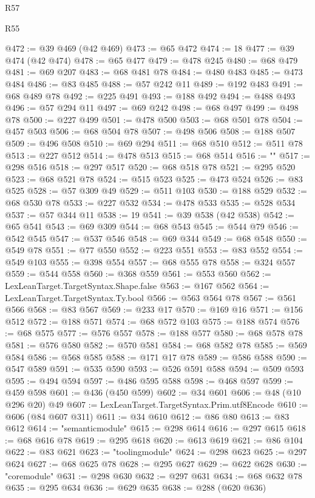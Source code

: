 \begin{lexlean}{R57}
\begin{lexlean}{R55}
\begin{coremodule}
{{{{{{{{{{{{{{{{{{{{{{{{{{{{{{{{{{{{{{{{{{{{{{{{{{{{{{{{{{{{{@472 := @39 @469 (@42 @469)
@473 := @65 @472
@474 := 18
@477 := @39 @474 (@42 @474)
@478 := @65 @477
@479 := @478 @245
@480 := @68 @479
@481 := @69 @207
@483 := @68 @481 @78
@484 := @480 @483
@485 := @473 @484
@486 := @83 @485
@488 := @57 @242 @11
@489 := @192 @483
@491 := @68 @489 @78
@492 := @225 @491
@493 := @188 @492
@494 := @488 @493
@496 := @57 @294 @11
@497 := @69 @242
@498 := @68 @497
@499 := @498 @78
@500 := @227 @499
@501 := @478 @500
@503 := @68 @501 @78
@504 := @457 @503
@506 := @68 @504 @78
@507 := @498 @506
@508 := @188 @507
@509 := @496 @508
@510 := @69 @294
@511 := @68 @510
@512 := @511 @78
@513 := @227 @512
@514 := @478 @513
@515 := @68 @514
@516 := "{"
@517 := @298 @516
@518 := @297 @517
@520 := @68 @518 @78
@521 := @295 @520
@523 := @68 @521 @78
@524 := @515 @523
@525 := @473 @524
@526 := @83 @525
@528 := @57 @309 @49
@529 := @511 @103
@530 := @188 @529
@532 := @68 @530 @78
@533 := @227 @532
@534 := @478 @533
@535 := @528 @534
@537 := @57 @344 @11
@538 := 19
@541 := @39 @538 (@42 @538)
@542 := @65 @541
@543 := @69 @309
@544 := @68 @543
@545 := @544 @79
@546 := @542 @545
@547 := @537 @546
@548 := @69 @344
@549 := @68 @548
@550 := @549 @78
@551 := @77 @550
@552 := @223 @551
@553 := @83 @552
@554 := @549 @103
@555 := @398 @554
@557 := @68 @555 @78
@558 := @324 @557
@559 := @544 @558
@560 := @368 @559
@561 := @553 @560
@562 := LexLeanTarget.TargetSyntax.Shape.false
@563 := @167 @562
@564 := LexLeanTarget.TargetSyntax.Ty.bool
@566 := @563 @564 @78
@567 := @561 @566
@568 := @83 @567
@569 := @233 @17
@570 := @169 @16
@571 := @156 @512
@572 := @188 @571
@574 := @68 @572 @103
@575 := @188 @574
@576 := @68 @575
@577 := @576 @557
@578 := @188 @577
@580 := @68 @578 @78
@581 := @576 @580
@582 := @570 @581
@584 := @68 @582 @78
@585 := @569 @584
@586 := @568 @585
@588 := @171 @17 @78
@589 := @586 @588
@590 := @547 @589
@591 := @535 @590
@593 := @526 @591 @588
@594 := @509 @593
@595 := @494 @594
@597 := @486 @595 @588
@598 := @468 @597
@599 := @459 @598
@601 := @436 (@450 @599)
@602 := @34 @601
@606 := @48 (@10 @296 @20) @49
@607 := LexLeanTarget.TargetSyntax.Prim.utf8Encode
@610 := @606 (@84 @607 @311)
@611 := @34 @610
@612 := @86 @80
@613 := @83 @612
@614 := "semanticmodule"
@615 := @298 @614
@616 := @297 @615
@618 := @68 @616 @78
@619 := @295 @618
@620 := @613 @619
@621 := @86 @104
@622 := @83 @621
@623 := "toolingmodule"
@624 := @298 @623
@625 := @297 @624
@627 := @68 @625 @78
@628 := @295 @627
@629 := @622 @628
@630 := "coremodule"
@631 := @298 @630
@632 := @297 @631
@634 := @68 @632 @78
@635 := @295 @634
@636 := @629 @635
@638 := @288 (@620 @636)
}}}}}}}}}}}}}}}}}}}}}}}}}}}}}}}}}}}}}}}}}}}}}}}}}}}}}}}}}}}}}}
\end{coremodule}
\end{lexlean}
\end{lexlean}
